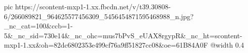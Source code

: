  
 
 
 
 

\ifcmt
  pic https://scontent-mxp1-1.xx.fbcdn.net/v/t39.30808-6/266089821_964625577456309_5456454871595468988_n.jpg?_nc_cat=100&ccb=1-5&_nc_sid=730e14&_nc_ohc=mus7bPvS_eUAX8rgypR&_nc_ht=scontent-mxp1-1.xx&oh=82dc6802353e499cf76a9ff51827cc08&oe=61B84A0F
  @width 0.4
\fi
